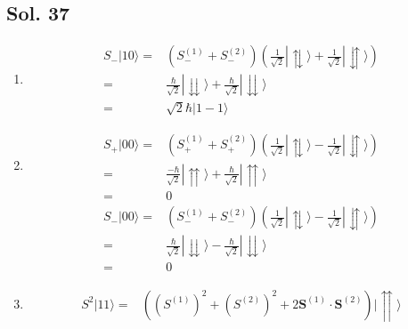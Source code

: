        \subsection*{Sol. 37}
       \begin{enumerate}
           \item \begin{align*}
               S_-|10\rangle =& 
               (S_-^{(1)} + S_-^{(2)})
           (\frac{1}{\sqrt{2}}
           |\updownarrows\rangle
           +\frac{1}{\sqrt{2}}
           |\downuparrows\rangle)\\
           =&
           \frac{\hbar}{\sqrt{2}}
           |\downdownarrows\rangle
           +
           \frac{\hbar}{\sqrt{2}}
           |\downdownarrows\rangle
           \\
           =&\sqrt{2}\hbar|1-1\rangle
           \end{align*}
           \item 
           \begin{align*}
               S_+|00\rangle =& 
               (S_+^{(1)} + S_+^{(2)})
           (\frac{1}{\sqrt{2}}
           |\updownarrows\rangle
           -\frac{1}{\sqrt{2}}
           |\downuparrows\rangle)\\
           =&
           \frac{-\hbar}{\sqrt{2}}
           |\upuparrows\rangle
           +
           \frac{\hbar}{\sqrt{2}}
           |\upuparrows\rangle
           \\
           =&0
           \end{align*}
           \begin{align*}
               S_-|00\rangle =& 
               (S_-^{(1)} + S_-^{(2)})
           (\frac{1}{\sqrt{2}}
           |\updownarrows\rangle
           -\frac{1}{\sqrt{2}}
           |\downuparrows\rangle)\\
           =&
           \frac{\hbar}{\sqrt{2}}
           |\downdownarrows\rangle
           -
           \frac{\hbar}{\sqrt{2}}
           |\downdownarrows\rangle
           \\
           =&0
           \end{align*}
           \item 
           \begin{align*}
               S^2|11\rangle = 
               &
               ((S^{(1)})^2 +(S^{(2)})^2
               +2\bm{S}^{(1)}
               \cdot
               \bm{S}^{(2)})
               |\upuparrows\rangle
           \end{align*}
           \begin{align*}

\end{align*}
\end{enumerate}
